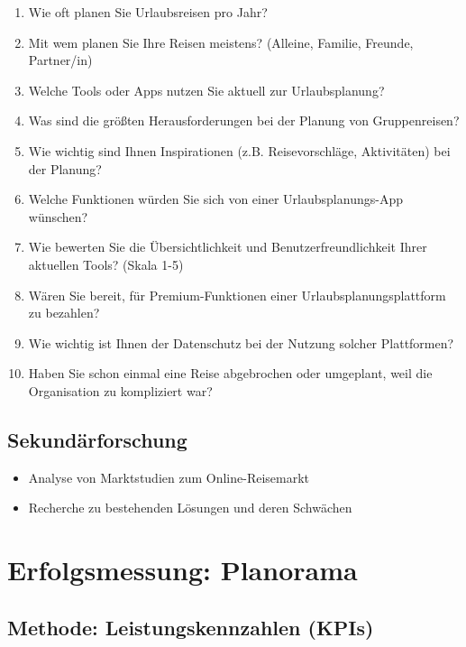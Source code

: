 \documentclass{article}
\begin{document}
\begin{enumerate}
\def\labelenumi{\arabic{enumi}.}
\tightlist
\item
  Wie oft planen Sie Urlaubsreisen pro Jahr?
\item
  Mit wem planen Sie Ihre Reisen meistens? (Alleine, Familie, Freunde,
  Partner/in)
\item
  Welche Tools oder Apps nutzen Sie aktuell zur Urlaubsplanung?
\item
  Was sind die größten Herausforderungen bei der Planung von
  Gruppenreisen?
\item
  Wie wichtig sind Ihnen Inspirationen (z.B. Reisevorschläge,
  Aktivitäten) bei der Planung?
\item
  Welche Funktionen würden Sie sich von einer Urlaubsplanungs-App
  wünschen?
\item
  Wie bewerten Sie die Übersichtlichkeit und Benutzerfreundlichkeit
  Ihrer aktuellen Tools? (Skala 1-5)
\item
  Wären Sie bereit, für Premium-Funktionen einer
  Urlaubsplanungsplattform zu bezahlen?
\item
  Wie wichtig ist Ihnen der Datenschutz bei der Nutzung solcher
  Plattformen?
\item
  Haben Sie schon einmal eine Reise abgebrochen oder umgeplant, weil die
  Organisation zu kompliziert war?
\end{enumerate}

\subsection{Sekundärforschung}\label{sekunduxe4rforschung}

\begin{itemize}
\tightlist
\item
  Analyse von Marktstudien zum Online-Reisemarkt
\item
  Recherche zu bestehenden Lösungen und deren Schwächen
\end{itemize}

\newpage

\section{Erfolgsmessung: Planorama}\label{erfolgsmessung-planorama}

\subsection{Methode: Leistungskennzahlen
(KPIs)}\label{methode-leistungskennzahlen-kpis}
\end{document}
